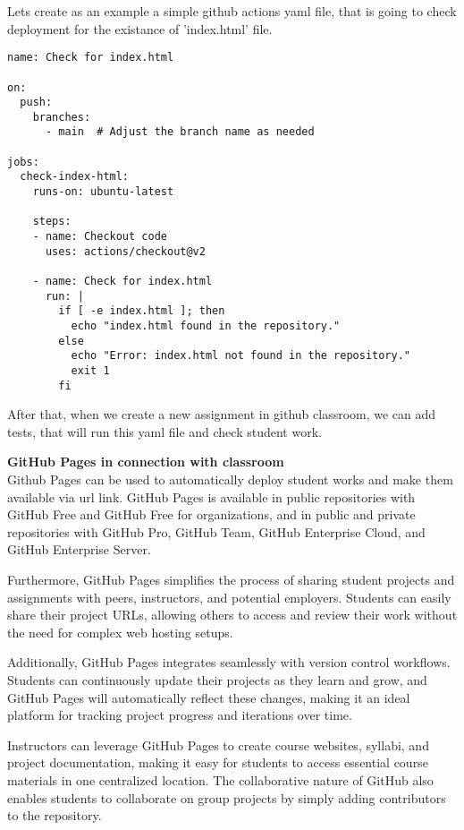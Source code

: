 \documentclass[a4paper,11pt]{article}
\begin{document}
\begin{large}
Lets create as an example a simple github actions yaml file, that is going to check deployment for the existance of 'index.html' file. 

\begin{lstlisting}
name: Check for index.html

on:
  push:
    branches:
      - main  # Adjust the branch name as needed

jobs:
  check-index-html:
    runs-on: ubuntu-latest

    steps:
    - name: Checkout code
      uses: actions/checkout@v2

    - name: Check for index.html
      run: |
        if [ -e index.html ]; then
          echo "index.html found in the repository."
        else
          echo "Error: index.html not found in the repository."
          exit 1
        fi
\end{lstlisting}

After that, when we create a new assignment in github classroom, we can add tests, that will run this yaml file and check student work.



\textbf{GitHub Pages in connection with classroom} \\
Github Pages can be used to automatically deploy student works and make them available via url link. GitHub Pages is available in public repositories with GitHub Free and GitHub Free for organizations, and in public and private repositories with GitHub Pro, GitHub Team, GitHub Enterprise Cloud, and GitHub Enterprise Server. 

Furthermore, GitHub Pages simplifies the process of sharing student projects and assignments with peers, instructors, and potential employers. Students can easily share their project URLs, allowing others to access and review their work without the need for complex web hosting setups.

Additionally, GitHub Pages integrates seamlessly with version control workflows. Students can continuously update their projects as they learn and grow, and GitHub Pages will automatically reflect these changes, making it an ideal platform for tracking project progress and iterations over time.

Instructors can leverage GitHub Pages to create course websites, syllabi, and project documentation, making it easy for students to access essential course materials in one centralized location. The collaborative nature of GitHub also enables students to collaborate on group projects by simply adding contributors to the repository.


\end{large}
\end{document}
